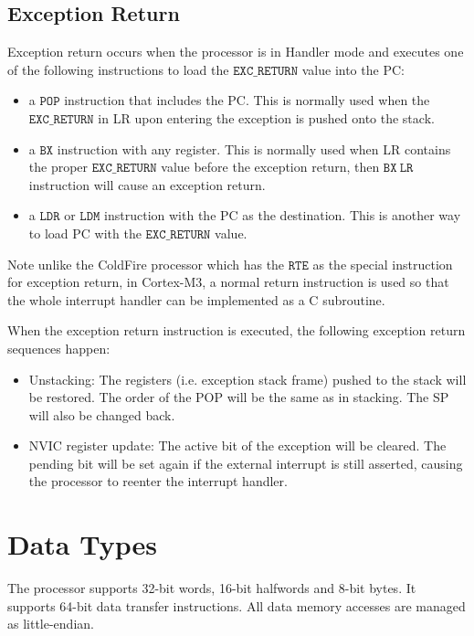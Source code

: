 \subsection{Exception Return}
Exception return occurs when the processor is in Handler mode and executes one of the following instructions to load the $\mathtt{EXC\_RETURN}$ value into the PC:
\begin{itemize}
\item a $\mathtt{POP}$ instruction that includes the PC. This is normally used when the $\mathtt{EXC\_RETURN}$ in LR upon entering the exception is pushed onto the stack.  
\item a $\mathtt{BX}$ instruction with any register. This is normally used when LR contains the proper $\mathtt{EXC\_RETURN}$ value before the exception return, then $\mathtt{BX~ LR}$ instruction will cause an exception return.
\item a $\mathtt{LDR}$ or $\mathtt{LDM}$ instruction with the PC as the destination. This is another way to load PC with the $\mathtt{EXC\_RETURN}$ value.
\end{itemize}

Note unlike the ColdFire processor which has the $\mathtt{RTE}$ as the 
special instruction for exception return, in Cortex-M3, a normal return instruction is used so that the whole interrupt handler can be implemented as a C subroutine. 

When the exception return instruction is executed, the following exception return sequences happen:
\begin{itemize}
\item Unstacking: The registers (i.e. exception stack frame) pushed to the stack will be restored. The order of the POP will be the same as in stacking. The SP will also be changed back.
\item NVIC register update: The active bit of the exception will be cleared. The pending bit will be set again if the external interrupt is still asserted, causing the processor to reenter the interrupt handler.
\end{itemize}


\section{Data Types}
The processor supports 32-bit words, 16-bit halfwords and 8-bit bytes. 
It supports 64-bit data transfer instructions. 
All data memory accesses are managed as little-endian.



